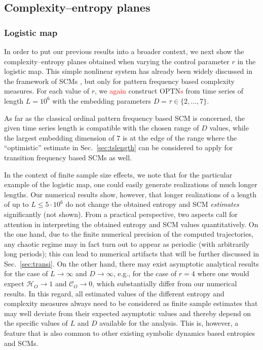\documentclass[aip,cha,reprint,nofootinbib]{revtex4-1}
\begin{document}
\subsection{Complexity--entropy planes} \label{sec:plane}
\subsubsection{Logistic map} 
In order to put our previous results into a broader context, we next show the complexity--entropy planes obtained when varying the control parameter $r$ in the logistic map. This simple nonlinear system has already been widely discussed in the framework of SCMs \cite{RossoPRE2007,MartinPLA2003}, but only for pattern frequency based complexity measures. For each value of $r$, we \textcolor{red}{again} construct OPTN\textcolor{red}{s} from time series of length $L = 10 ^ 6$ with the embedding parameters $D = \tau \in \{2,\ldots,7\}$. {\color{red}As far as the classical ordinal pattern frequency based SCM is concerned, the given time series length is compatible with the chosen range of $D$ values, while the largest embedding dimension of $7$ is at the edge of the range where the ``optimistic'' estimate in Sec.~\ref{sec:tslength} can be considered to apply for transition frequency based SCMs as well.

In the context of finite sample size effects, we note that for the particular example of the logistic map, one could easily generate realizations of much longer lengths. Our numerical results show, however, that longer realizations of a length of up to $L\leq5\cdot 10^6$ do not change the obtained entropy and SCM \emph{estimates} significantly (not shown). From a practical perspective, two aspects call for attention in interpreting the obtained entropy and SCM values quantitatively. On the one hand, due to the finite numerical precision of the computed trajectories, any chaotic regime may in fact turn out to appear as periodic (with arbitrarily long periods); this can lead to numerical artifacts that will be further discussed in Sec.~\ref{sec:transi}. On the other hand, there may exist asymptotic analytical results for the case of $L\to\infty$ and $D\to\infty$, e.g., for the case of $r=4$ where one would expect $\mathcal{H}_O\to 1$ and $\mathcal{C}_O\to 0$, which substantially differ from our numerical results. In this regard, all estimated values of the different entropy and complexity measures always need to be considered as finite sample estimates that may well deviate from their expected asymptotic values and thereby depend on the specific values of $L$ and $D$ available for the analysis. This is, however, a feature that is also common to other existing symbolic dynamics based entropies and SCMs.

}
\end{document}
